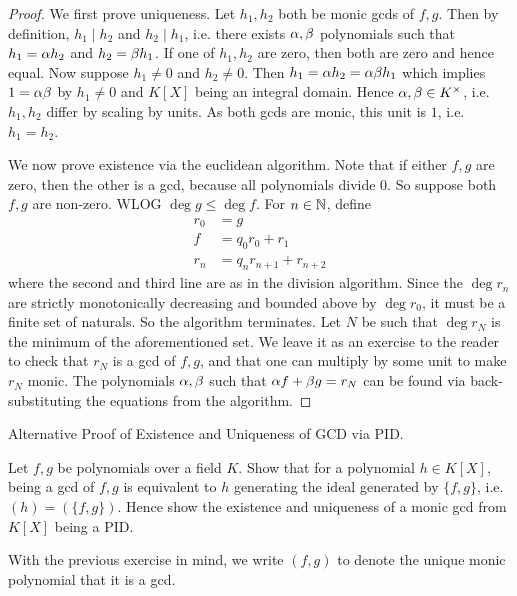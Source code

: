 \documentclass[../../book.tex]{subfiles}
\begin{document}
\begin{proof}
    We first prove uniqueness. 
    Let $h_1, h_2$ both be monic gcds of $f, g$. 
    Then by definition, $h_1 \mid h_2$ and $h_2 \mid h_1$, i.e.
    there exists $\alpha, \beta$ polynomials such that 
    $h_1 = \alpha h_2$ and $h_2=\beta h_1$.
    If one of $h_1, h_2$ are zero, then both are zero and hence equal.
    Now suppose $h_1 \neq 0$ and $h_2 \neq 0$. 
    Then $h_1 = \alpha h_2 = \alpha \beta h_1$ which implies $1 = \alpha \beta$ 
    by $h_1 \neq 0$ and $K[X]$ being an integral domain. 
    Hence $\alpha, \beta \in K^\times$, i.e. $h_1, h_2$ differ by scaling by units.
    As both gcds are monic, this unit is $1$, i.e. $h_1 = h_2$.
    
    We now prove existence via the euclidean algorithm.
    Note that if either $f, g$ are zero, then the other is a gcd, 
    because all polynomials divide $0$. 
    So suppose both $f, g$ are non-zero. WLOG $\deg g \leq \deg f$.
    For $n \in \mathbb{N}$, define \begin{align*}
        r_0 &= g \\
        f &= q_0 r_0 + r_1 \\
        r_n &= q_n r_{n+1} + r_{n+2}
    \end{align*}
    where the second and third line are as in the division algorithm. 
    Since the $\deg r_n$ are strictly monotonically decreasing and
    bounded above by $\deg r_0$, it must be a finite set of naturals.
    So the algorithm terminates. 
    Let $N$ be such that $\deg r_N$ is the minimum of the aforementioned set. 
    We leave it as an exercise to the reader to check that
    $r_N$ is a gcd of $f, g$,
    and that one can multiply by some unit to make $r_N$ monic.
    The polynomials $\alpha, \beta$ such that $\alpha f + \beta g = r_N$ 
    can be found via back-substituting the equations from the algorithm. 
\end{proof}
\begin{ex} Alternative Proof of Existence and Uniqueness of GCD via PID.

    Let $f, g$ be polynomials over a field $K$.
    Show that for a polynomial $h \in K[X]$, 
    being a gcd of $f, g$ is equivalent to 
    $h$ generating the ideal generated by $\{f, g\}$, i.e. $(h) = (\{f, g\})$.
    Hence show the existence and uniqueness of a monic gcd from $K[X]$ being a PID.
\end{ex}
With the previous exercise in mind, 
we write $(f,g)$ to denote the unique monic polynomial that it is a gcd.
\end{document}
